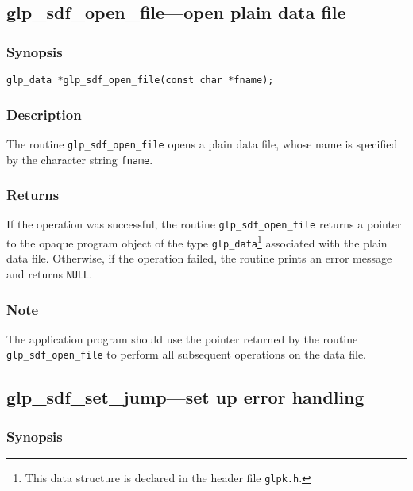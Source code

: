 \subsection{glp\_sdf\_open\_file---open plain data file}

\subsubsection*{Synopsis}

\begin{verbatim}
glp_data *glp_sdf_open_file(const char *fname);
\end{verbatim}

\subsubsection*{Description}

The routine \verb|glp_sdf_open_file| opens a plain data file, whose
name is specified by the character string \verb|fname|.

\subsubsection*{Returns}

If the operation was successful, the routine \verb|glp_sdf_open_file|
returns a pointer to the opaque program object of the type
\verb|glp_data|\footnote{This data structure is declared in the header
file {\tt glpk.h}.} associated with the plain data file. Otherwise, if
the operation failed, the routine prints an error message and returns
\verb|NULL|.

\subsubsection*{Note}

The application program should use the pointer returned by the routine
\verb|glp_sdf_open_file| to perform all subsequent operations on the
data file.

\newpage

\subsection{glp\_sdf\_set\_jump---set up error handling}

\subsubsection*{Synopsis}

